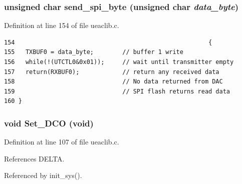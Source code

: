 \subsubsection{\setlength{\rightskip}{0pt plus 5cm}unsigned char send\_\-spi\_\-byte (unsigned char {\em data\_\-byte})}\label{ueaclib_8c_a14}




Definition at line 154 of file ueaclib.c.

\footnotesize\begin{verbatim}154                                                      {
155   TXBUF0 = data_byte;        // buffer 1 write  
156   while(!(UTCTL0&0x01));     // wait until transmitter empty
157   return(RXBUF0);            // return any received data
158                              // No data returned from DAC
159                              // SPI flash returns read data
160 }
\end{verbatim}\normalsize 


\subsubsection{\setlength{\rightskip}{0pt plus 5cm}void Set\_\-DCO (void)}\label{ueaclib_8c_a10}




Definition at line 107 of file ueaclib.c.

References DELTA.

Referenced by init\_\-sys().

